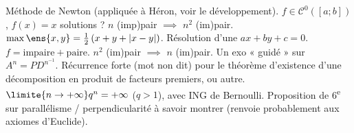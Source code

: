 \markdownRendererDocumentBegin
{}\markdownRendererInterblockSeparator
{}\markdownRendererSectionBegin
{}\markdownRendererInterblockSeparator
{}\markdownRendererUlBeginTight
\markdownRendererUlItem Méthode de Newton (appliquée à Héron, voir le développement).\markdownRendererUlItemEnd 
\markdownRendererUlItem $f \in \mathscr C^0([a;b])$, $f(x)=x$ solutions ?\markdownRendererUlItemEnd 
\markdownRendererUlEndTight \markdownRendererInterblockSeparator
{}
\markdownRendererSectionEnd \markdownRendererSectionBegin
{}\markdownRendererInterblockSeparator
{}\markdownRendererUlBeginTight
\markdownRendererUlItem $n$ (imp)pair $\implies$ $n^2$ (im)pair.\markdownRendererUlItemEnd 
\markdownRendererUlItem $\max \ens{x,y} = \frac{1}{2} \left( x + y + |x-y| \right)$.\markdownRendererUlItemEnd 
\markdownRendererUlEndTight \markdownRendererInterblockSeparator
{}
\markdownRendererSectionEnd \markdownRendererSectionBegin
{}\markdownRendererInterblockSeparator
{}\markdownRendererUlBeginTight
\markdownRendererUlItem Résolution d'une $ax+by+c=0$.\markdownRendererUlItemEnd 
\markdownRendererUlItem $f = \text{impaire}+\text{paire}$.\markdownRendererUlItemEnd 
\markdownRendererUlEndTight \markdownRendererInterblockSeparator
{}
\markdownRendererSectionEnd \markdownRendererSectionBegin
{}\markdownRendererInterblockSeparator
{}\markdownRendererUlBeginTight
\markdownRendererUlItem $n^2$ (im)pair $\implies$ $n$ (im)pair.\markdownRendererUlItemEnd 
\markdownRendererUlEndTight \markdownRendererInterblockSeparator
{}
\markdownRendererSectionEnd \markdownRendererSectionBegin
{}\markdownRendererInterblockSeparator
{}\markdownRendererUlBeginTight
\markdownRendererUlItem Un exo « guidé » sur $A^n=PD^n^{-1}$.\markdownRendererUlItemEnd 
\markdownRendererUlItem Récurrence forte (mot non dit) pour le théorème d'existence d'une décomposition en produit de facteurs premiers, ou autre.\markdownRendererUlItemEnd 
\markdownRendererUlItem $\limite{n \to +\infty} q^n = +\infty$ ($q>1$), avec ING de Bernoulli.\markdownRendererUlItemEnd 
\markdownRendererUlEndTight \markdownRendererInterblockSeparator
{}
\markdownRendererSectionEnd \markdownRendererSectionBegin
{}\markdownRendererInterblockSeparator
{}\markdownRendererUlBeginTight
\markdownRendererUlItem Proposition de 6\textsuperscript e sur parallélisme / perpendicularité à savoir montrer (renvoie probablement aux axiomes d'Euclide).\markdownRendererUlItemEnd 
